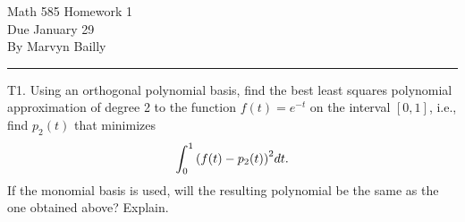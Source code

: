 \documentclass[12pt]{report}
\begin{document}
\large

\begin{center}
 Math 585 Homework 1\\
 Due January 29\\
 By Marvyn Bailly\\
\end{center}

\normalsize

\hrule



\begin{problem}
    T1. Using an orthogonal polynomial basis, find the best least squares polynomial approximation of degree 2 to the function $f(t) = e^{-t}$ on the interval $[0, 1]$, i.e., find $p_2(t)$ that minimizes
    \[ 
        \int_0^1 {\left(f(t) - p_2(t)\right)}^2dt.
    \]
    If the monomial basis is used, will the resulting polynomial be the same as the one obtained above? Explain.
\end{problem}
\end{document}
